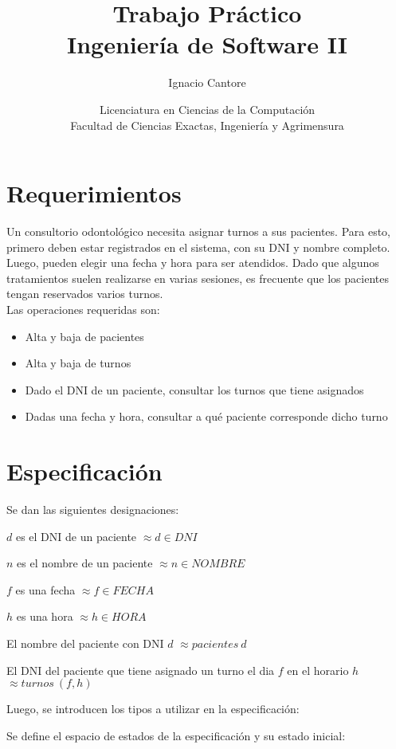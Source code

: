 \documentclass[12pt]{article}
\title{Trabajo Práctico \\ Ingeniería de Software II}
\author{Ignacio Cantore}
\date{Licenciatura en Ciencias de la Computación \\ Facultad de Ciencias Exactas, Ingeniería y Agrimensura \\}
\newcommand{\desig}[2]{\item #1 $\approx #2$}
\newenvironment{designations}
  {\begin{leftbar}
    \begin{list}{}{\setlength{\labelsep}{0cm}
                   \setlength{\labelwidth}{0cm}
                   \setlength{\listparindent}{0cm}
                   \setlength{\rightmargin}{\leftmargin}}}
  {\end{list}\end{leftbar}}
\begin{document}
\maketitle

\section*{Requerimientos}
Un consultorio odontológico necesita asignar turnos a sus pacientes.
Para esto, primero deben estar registrados en el sistema, con su DNI y nombre completo. Luego, pueden elegir una fecha y hora para ser atendidos.
Dado que algunos tratamientos suelen realizarse en varias sesiones, es frecuente que los pacientes tengan reservados varios turnos. \\

Las operaciones requeridas son:

\begin{itemize}
    \item Alta y baja de pacientes
    \item Alta y baja de turnos
    \item Dado el DNI de un paciente, consultar los turnos que tiene asignados
    \item Dadas una fecha y hora, consultar a qué paciente corresponde dicho turno
\end{itemize}

\section*{Especificación}

Se dan las siguientes designaciones:

\begin{designations}
\desig{$d$ es el DNI de un paciente}{d \in DNI}
\desig{$n$ es el nombre de un paciente}{n \in NOMBRE}
\desig{$f$ es una fecha}{f \in FECHA}
\desig{$h$ es una hora}{h \in HORA}
\desig{El nombre del paciente con DNI $d$}{pacientes\ d}
\desig{El DNI del paciente que tiene asignado un turno el dia $f$ en el horario $h$}{turnos\ (f, h)}
\end{designations}

Luego, se introducen los tipos a utilizar en la especificación:

\begin{zed}
\end{zed}

Se define el espacio de estados de la especificación y su estado inicial:
\end{document}
